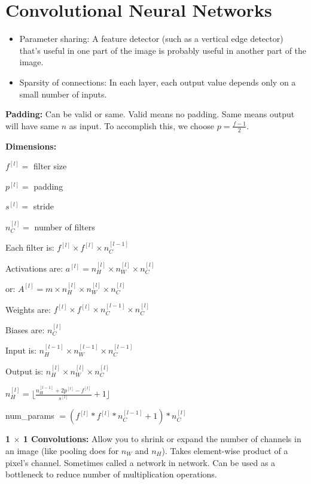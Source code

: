 \section{Convolutional Neural Networks}

\begin{itemize}[wide, labelwidth=!, labelindent=0pt]
\itemsep0em 
    \item Parameter sharing: A feature detector (such as a vertical edge detector) that’s useful in one part of the image is probably useful in another part of the image.
    \item Sparsity of connections: In each layer, each output value depends only on a small number of inputs. \vspace*{-\baselineskip}
\end{itemize}

\textbf{Padding:} Can be valid or same. Valid means no padding. Same means output will have same $n$ as input. To accomplish this, we choose $p = \frac{f-1}{2}$.

\textbf{Dimensions:}

$f^{[l]} = $ filter size

$p^{[l]} = $ padding

$s^{[l]} = $ stride

$n_C^{[l]} = $ number of filters

Each filter is: $f^{[l]} \times f^{[l]} \times n_C^{[l-1]}$

Activations are: $a^{[l]} = n_H^{[l]} \times n_W^{[l]} \times n_C^{[l]}$

or: $A^{[l]} = m \times n_H^{[l]} \times n_W^{[l]} \times n_C^{[l]}$

Weights are: $f^{[l]} \times f^{[l]} \times n_C^{[l-1]} \times n_C^{[l]}$

Biases are: $n_C^{[l]}$

Input is: $n_H^{[l-1]} \times n_W^{[l-1]} \times n_C^{[l-1]}$

Output is: $n_H^{[l]} \times n_W^{[l]} \times n_C^{[l]}$

$n_H^{[l]} = \lfloor \frac{n_H^{[l-1]} + 2p^{[l]} - f^{[l]}}{s^{[l]}} + 1 \rfloor$

num_params $= (f^{[l]} * f^{[l]} * n_C^{[l-1]} + 1) * n_C^{[l]}$

\textbf{1 $\times$ 1 Convolutions: } Allow you to shrink or expand the number of channels in an image (like pooling does for $n_W$ and $n_H$). Takes element-wise product of a pixel's channel. Sometimes called a network in network. Can be used as a bottleneck to reduce number of multiplication operations.

